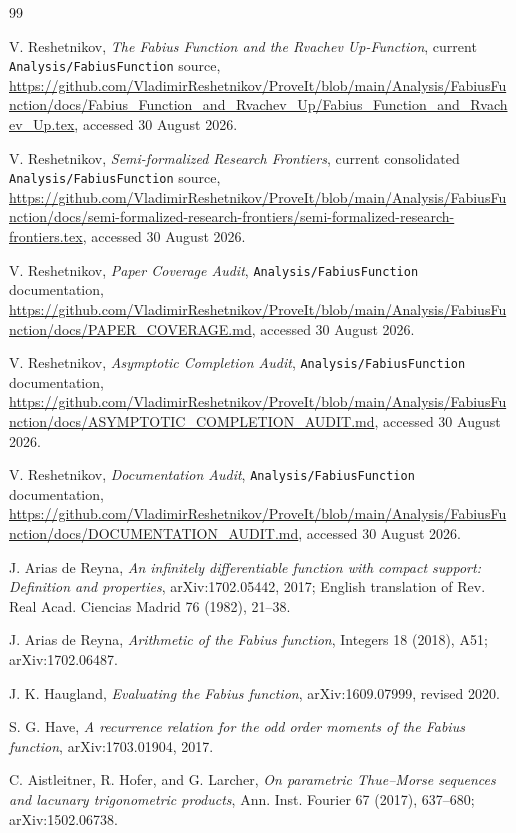 \documentclass[11pt,oneside]{article}
\theoremstyle{definition}
\theoremstyle{remark}
\newcommand{\repo}{\nolinkurl{Analysis/FabiusFunction}}
\begin{document}
\begin{thebibliography}{99}

V. Reshetnikov,
\emph{The Fabius Function and the Rvachev Up-Function},
current \repo{} source,
\url{https://github.com/VladimirReshetnikov/ProveIt/blob/main/Analysis/FabiusFunction/docs/Fabius_Function_and_Rvachev_Up/Fabius_Function_and_Rvachev_Up.tex},
accessed 30 August 2026.

V. Reshetnikov,
\emph{Semi-formalized Research Frontiers},
current consolidated \repo{} source,
\url{https://github.com/VladimirReshetnikov/ProveIt/blob/main/Analysis/FabiusFunction/docs/semi-formalized-research-frontiers/semi-formalized-research-frontiers.tex},
accessed 30 August 2026.

V. Reshetnikov,
\emph{Paper Coverage Audit},
\repo{} documentation,
\url{https://github.com/VladimirReshetnikov/ProveIt/blob/main/Analysis/FabiusFunction/docs/PAPER_COVERAGE.md},
accessed 30 August 2026.

V. Reshetnikov,
\emph{Asymptotic Completion Audit},
\repo{} documentation,
\url{https://github.com/VladimirReshetnikov/ProveIt/blob/main/Analysis/FabiusFunction/docs/ASYMPTOTIC_COMPLETION_AUDIT.md},
accessed 30 August 2026.

V. Reshetnikov,
\emph{Documentation Audit},
\repo{} documentation,
\url{https://github.com/VladimirReshetnikov/ProveIt/blob/main/Analysis/FabiusFunction/docs/DOCUMENTATION_AUDIT.md},
accessed 30 August 2026.

J. Arias de Reyna,
\emph{An infinitely differentiable function with compact support: Definition and properties},
arXiv:1702.05442, 2017; English translation of Rev. Real Acad. Ciencias Madrid 76 (1982), 21--38.

J. Arias de Reyna,
\emph{Arithmetic of the Fabius function},
Integers 18 (2018), A51; arXiv:1702.06487.

J. K. Haugland,
\emph{Evaluating the Fabius function},
arXiv:1609.07999, revised 2020.

S. G. Have,
\emph{A recurrence relation for the odd order moments of the Fabius function},
arXiv:1703.01904, 2017.

C. Aistleitner, R. Hofer, and G. Larcher,
\emph{On parametric Thue--Morse sequences and lacunary trigonometric products},
Ann. Inst. Fourier 67 (2017), 637--680; arXiv:1502.06738.


\end{thebibliography}
\end{document}
